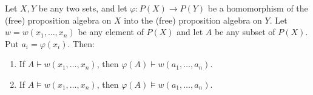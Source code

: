 Let $X, Y$ be any two sets, and let $\varphi: P(X) \rightarrow P(Y)$ be a homomorphism of the (free) proposition algebra on $X$ into the (free) proposition algebra on $Y$. Let $w = w(x_1, \ldots, x_n)$ be any element of $P(X)$ and let $A$ be any subset of $P(X)$. Put $a_i = \varphi(x_i)$. Then:
\begin{enumerate}
\item If $A \vdash w(x_1, \ldots, x_n)$, then $\varphi(A) \vdash w(a_1, \ldots, a_n)$.
\item If $A \models w(x_1, \ldots, x_n)$, then $\varphi(A) \models w(a_1, \ldots, a_n)$.
\end{enumerate}
